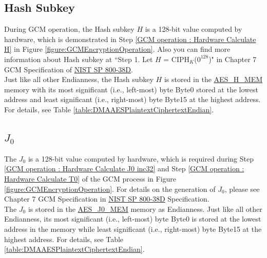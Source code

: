 \documentclass[main\_\_EN.tex]{subfiles}
\begin{document}
\subsection{Hash Subkey}\label{Label Hash subkey}

\label{memdesc:AESHMEM}During GCM operation, the Hash subkey $H$ is a 128-bit value computed by hardware, which is demonstrated in Step \ref{GCM operation : Hardware Calculate H} in Figure \ref{figure:GCMEncryptionOperation}. Also you can find more information about Hash subkey at ``Step 1. Let $H$ = CIPH$_K$({$0^{128}$})" in Chapter 7 GCM Specification of \href{https://nvlpubs.nist.gov/nistpubs/Legacy/SP/nistspecialpublication800-38d.pdf}{NIST SP 800-38D}.\\
Just like all other Endianness, the Hash subkey $H$ is stored in the \hyperref[memdesc:AESHMEM]{AES\_H\_MEM} memory with its most significant (i.e., left-most) byte Byte0 stored at the lowest address and least significant (i.e., right-most) byte Byte15 at the highest address. For details, see Table \ref{table:DMAAESPlaintextCiphertextEndian}.



\subsection{\texorpdfstring{$J_0$}{J0}} \label{Label J0}
 The $J_0$ is a 128-bit value computed by hardware, which is required during Step \ref{GCM operation : Hardware Calculate J0 inc32} and Step \ref{GCM operation : Hardware Calculate T0} of the GCM process in Figure \ref{figure:GCMEncryptionOperation}. For details on the generation of $J_0$, please see Chapter 7 GCM Specification in \href{https://nvlpubs.nist.gov/nistpubs/Legacy/SP/nistspecialpublication800-38d.pdf}{NIST SP 800-38D} Specification.\\

 The $J_0$ is stored in the \hyperref[memdesc:AESJ0MEM]{AES\_J0\_MEM} memory as Endianness\label{memdesc:AESJ0MEM}. Just like all other Endianness, its most significant (i.e., left-most) byte Byte0 is stored at the lowest address in the memory while least significant (i.e., right-most) byte Byte15 at the highest address. For details, see Table \ref{table:DMAAESPlaintextCiphertextEndian}.
\end{document}
